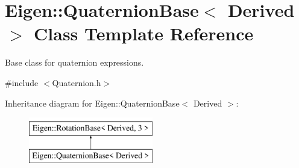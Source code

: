 \hypertarget{class_eigen_1_1_quaternion_base}{}\section{Eigen\+::Quaternion\+Base$<$ Derived $>$ Class Template Reference}
\label{class_eigen_1_1_quaternion_base}


Base class for quaternion expressions.  




{\ttfamily \#include $<$Quaternion.\+h$>$}

Inheritance diagram for Eigen\+::Quaternion\+Base$<$ Derived $>$\+:\begin{figure}[H]
\begin{center}
\leavevmode
\includegraphics[height=2.000000cm]{class_eigen_1_1_quaternion_base}
\end{center}
\end{figure}

